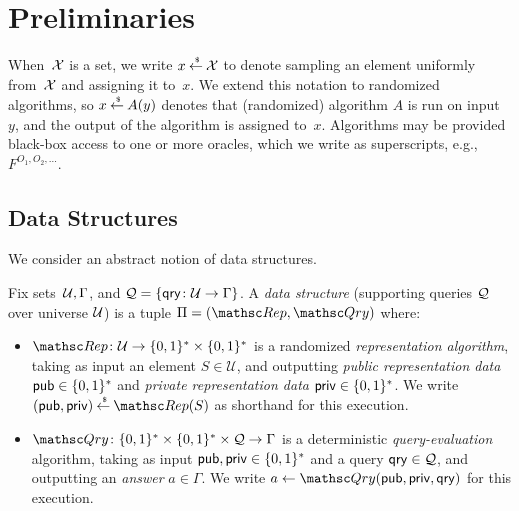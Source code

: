 \newcommand{\qry}{\mathsf{qry}}
\section{Preliminaries}

When~${\cal X}$ is a set, we write $x {\:\stackrel{{\scriptscriptstyle \hspace{0.2em}\$}} {\leftarrow}\:} {\cal X}$ to denote sampling
an element uniformly from~${\cal X}$ and assigning it to~$x$. We extend
this notation to randomized algorithms, so $x {\:\stackrel{{\scriptscriptstyle \hspace{0.2em}\$}} {\leftarrow}\:} A(y)$ denotes
that (randomized) algorithm $A$ is run on input~$y$, and the output
of the algorithm is assigned to~$x$. Algorithms may be provided
black-box access to one or more oracles, which we write as
superscripts, e.g., $F^{O_1,O_2,\ldots}$.

\subsection{Data Structures}

We consider an abstract notion of data structures.

\begin{definition} \rm
Fix sets~${\cal U}, \Gamma$, and $\calQ = \{\qry \colon {\cal U} \to
\Gamma\}$. A \emph{data structure} (supporting queries ${\cal Q}$ over
universe ${\cal U}$) is a tuple $\setprim=(\Rep, \Qry)$ where:
\begin{itemize}
\item $\Rep \colon {\cal U} \to \bits^* \times \bits^*$ is a
    randomized \emph{representation algorithm}, taking as input
    an element $S \in \mathcal{U}$,
    and outputting %
    \emph{public representation data} ${\sf pub} \in \{0,1\}^*$ and
    \emph{private representation data} ${\sf priv} \in \{0,1\}^*$.
    We write $(\pubaux,\privaux) \getsr \Rep(S)$ as shorthand
    for this execution.
\item $\Qry\colon \bits^* \times \bits^* \times \calQ \to
    \Gamma$ is a deterministic \emph{query-evaluation}
    algorithm, taking as input ${\sf pub},{\sf priv} \in \{0,1\}^*$
    and a query $\qry \in \calQ$, and outputting an
    \emph{answer} $a \in \Gamma$.  We write $a \gets
    \Qry(\pubaux,\privaux,\qry)$ for this execution. \hfill\dqed
\end{itemize}
\end{definition}


